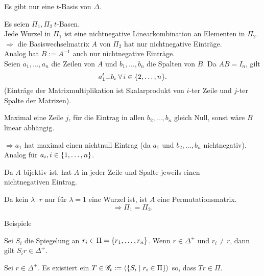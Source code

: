\documentclass{article}
\begin{document}
\begin{satz} %
    Es gibt nur eine \( t \)-Basis von \( \Delta \).
\end{satz}
\begin{bew}
    Es seien \( \Pi_1, \Pi_2\ t \)-Basen.\\
    Jede Wurzel in \( \Pi_1 \) ist eine nichtnegative 
    Linearkombination an Elementen in \( \Pi_2 \).\\
    \( \Rightarrow \) die Basiswechselmatrix \(A\) von 
    \( \Pi_2 \) hat nur nichtnegative Einträge.\\
    Analog hat \( B := A^{-1} \) auch nur nichtnegative 
    Einträge. \\
    Seien \( a_1, \ldots, a_n \) die Zeilen von \(A\) 
    und \( b_1, \ldots, b_n \) die Spalten von \(B\).
    Da \( AB = I_n \), gilt 
    \[ a_1^t \bot b_i \;\forall i \in \set{2, \ldots, n}. \]
    (Einträge der Matrixmultiplikation ist Skalarprodukt 
    von \(i\)-ter Zeile und \(j\)-ter Spalte der Matrizen).

    Maximal eine Zeile \( j \), für die Eintrag in allen 
    \( b_2, \ldots, b_n \) gleich Null, sonst wäre 
    \(B\) linear abhängig.

    \( \Rightarrow a_1 \) hat maximal einen 
    nichtnull Eintrag (da \(a_1\) und \( b_2, \ldots, b_n \) nichtnegativ).\\
    Analog für \( a_i, i \in \{1, \ldots, n\} \).

    Da \(A\) bijektiv ist, hat \(A\) in jeder Zeile und 
    Spalte jeweils einen \\
    nichtnegativen Eintrag.

    Da kein \( \lambda \cdot r \) nur für 
    \( \lambda = 1 \) eine Wurzel ist, 
    ist \( A \) eine Permutationsmatrix.
    \[ \Rightarrow \Pi_1 = \Pi_2. \]
\end{bew}

Beispiele

\begin{satz} %
    Sei \( S_i \) die Spiegelung an 
    \( r_i \in \Pi = \{r_1, \ldots, r_n\} \).
    Wenn \( r \in \Delta^+ \) und \( r_i \neq r \), 
    dann gilt \( S_i r \in \Delta^+ \).
\end{satz}

\begin{satz} %
    Sei \( r \in \Delta^+ \). Es existiert ein \( T \in 
    \mathscr{G}_t := \langle 
    \{S_i \;\vert\; r_i \in \Pi\} \rangle \) so, dass 
    \( Tr \in \Pi \).
\end{satz}
\end{document}
